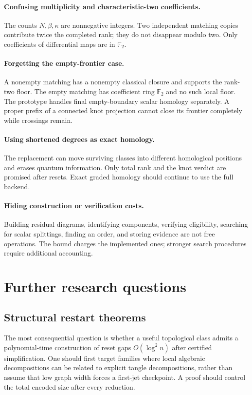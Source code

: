 \documentclass[11pt]{article}
\theoremstyle{definition}\newtheorem{definition}[theorem]{Definition}\newtheorem{example}[theorem]{Example}
\theoremstyle{remark}\newtheorem{remark}[theorem]{Remark}
\newcommand{\F}{{\mathbb{F}_2}}
\begin{document}
\paragraph{Confusing multiplicity and characteristic-two coefficients.}
The counts $N,\beta,\kappa$ are nonnegative integers. Two independent matching copies contribute twice the completed rank; they do not disappear modulo two. Only coefficients of differential maps are in $\F$.

\paragraph{Forgetting the empty-frontier case.}
A nonempty matching has a nonempty classical closure and supports the rank-two floor. The empty matching has coefficient ring $\F$ and no such local floor. The prototype handles final empty-boundary scalar homology separately. A proper prefix of a connected knot projection cannot close its frontier completely while crossings remain.

\paragraph{Using shortened degrees as exact homology.}
The replacement can move surviving classes into different homological positions and erases quantum information. Only total rank and the knot verdict are promised after resets. Exact graded homology should continue to use the full backend.

\paragraph{Hiding construction or verification costs.}
Building residual diagrams, identifying components, verifying eligibility, searching for scalar splittings, finding an order, and storing evidence are not free operations. The bound charges the implemented ones; stronger search procedures require additional accounting.

\section{Further research questions}
\subsection{Structural restart theorems}
The most consequential question is whether a useful topological class admits a polynomial-time construction of reset gaps $O(\log^2 n)$ after certified simplification. One should first target families where local algebraic decompositions can be related to explicit tangle decompositions, rather than assume that low graph width forces a first-jet checkpoint. A proof should control the total encoded size after every reduction.
\end{document}
